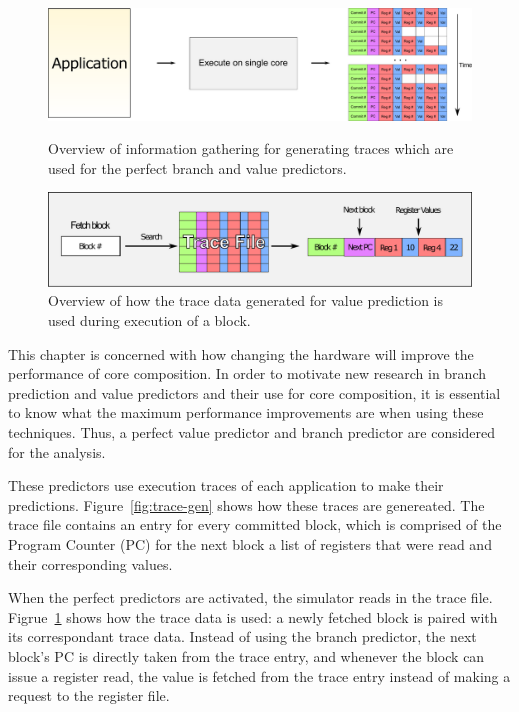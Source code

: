 \begin{figure}[t]
    \centering
    \includegraphics[width=1\textwidth]{chapter3/graphics/trace-gen.pdf}

    \caption{Overview of information gathering for generating traces which are used for the perfect branch and value predictors.}
    \label{fig:trace-gen}

    \centering
    \includegraphics[width=1\textwidth]{chapter3/graphics/fetching-trace.pdf}

    \caption{Overview of how the trace data generated for value prediction is used during execution of a block.}
    \label{fig:trace-used}
	\vspace{1em}
\end{figure}

This chapter is concerned with how changing the hardware will improve the performance of core composition.
In order to motivate new research in branch prediction and value predictors and their use for core composition, it is essential to know what the maximum performance improvements are when using these techniques. %
Thus, a perfect value predictor and branch predictor are considered for the analysis.

These predictors use execution traces of each application to make their predictions.
Figure~\ref{fig:trace-gen} shows how these traces are genereated.
The trace file contains an entry for every committed block, which is comprised of the Program Counter (PC) for the next block a list of registers that were read and their corresponding values.

When the perfect predictors are activated, the simulator reads in the trace file.
Figrue~\ref{fig:trace-used} shows how the trace data is used: a newly fetched block is paired with its correspondant trace data.
Instead of using the branch predictor, the next block's PC is directly taken from the trace entry, and whenever the block can issue a register read, the value is fetched from the trace entry instead of making a request to the register file.
\vspace{-2em}